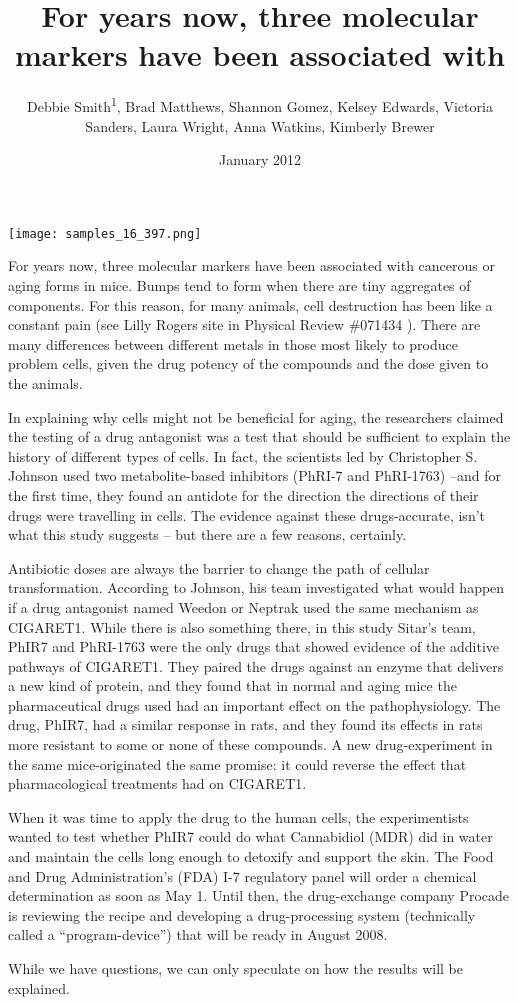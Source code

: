 \documentclass{article}
\title{For years now, three molecular markers have been associated with}
\author{Debbie Smith\textsuperscript{1},  Brad Matthews,  Shannon Gomez,  Kelsey Edwards,  Victoria Sanders,  Laura Wright,  Anna Watkins,  Kimberly Brewer}
\affil{\textsuperscript{1}University Hospital Erlangen}
\date{January 2012}
\begin{document}
\maketitle

\begin{center}
\begin{minipage}{0.75\linewidth}
\texttt{[image: samples\_16\_397.png]}
\end{minipage}
\end{center}

For years now, three molecular markers have been associated with cancerous or aging forms in mice. Bumps tend to form when there are tiny aggregates of components. For this reason, for many animals, cell destruction has been like a constant pain (see Lilly Rogers site in Physical Review \#071434 ). There are many differences between different metals in those most likely to produce problem cells, given the drug potency of the compounds and the dose given to the animals.

In explaining why cells might not be beneficial for aging, the researchers claimed the testing of a drug antagonist was a test that should be sufficient to explain the history of different types of cells. In fact, the scientists led by Christopher S. Johnson used two metabolite-based inhibitors (PhRI-7 and PhRI-1763) –and for the first time, they found an antidote for the direction the directions of their drugs were travelling in cells. The evidence against these drugs-accurate, isn’t what this study suggests – but there are a few reasons, certainly.

Antibiotic doses are always the barrier to change the path of cellular transformation. According to Johnson, his team investigated what would happen if a drug antagonist named Weedon or Neptrak used the same mechanism as CIGARET1. While there is also something there, in this study Sitar’s team, PhIR7 and PhRI-1763 were the only drugs that showed evidence of the additive pathways of CIGARET1. They paired the drugs against an enzyme that delivers a new kind of protein, and they found that in normal and aging mice the pharmaceutical drugs used had an important effect on the pathophysiology. The drug, PhIR7, had a similar response in rats, and they found its effects in rats more resistant to some or none of these compounds. A new drug-experiment in the same mice-originated the same promise: it could reverse the effect that pharmacological treatments had on CIGARET1.

When it was time to apply the drug to the human cells, the experimentists wanted to test whether PhIR7 could do what Cannabidiol (MDR) did in water and maintain the cells long enough to detoxify and support the skin. The Food and Drug Administration’s (FDA) I-7 regulatory panel will order a chemical determination as soon as May 1. Until then, the drug-exchange company Procade is reviewing the recipe and developing a drug-processing system (technically called a “program-device”) that will be ready in August 2008.

While we have questions, we can only speculate on how the results will be explained.
\end{document}
